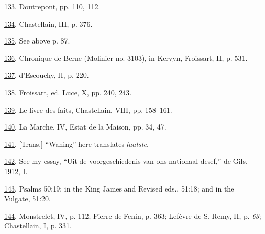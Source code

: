 \protect\hypertarget{23_NOTES.xhtmlux5cux23id_1670}{\protect\hyperlink{10_Chapter_Three__THE_HEROIC_DREAM.xhtmlux5cux23id_1669}{133}}.
Doutrepont, pp. 110, 112.

\protect\hypertarget{23_NOTES.xhtmlux5cux23id_1668}{\protect\hyperlink{10_Chapter_Three__THE_HEROIC_DREAM.xhtmlux5cux23id_1667}{134}}.
Chastellain, III, p. 376.

\protect\hypertarget{23_NOTES.xhtmlux5cux23id_1666}{\protect\hyperlink{10_Chapter_Three__THE_HEROIC_DREAM.xhtmlux5cux23id_1665}{135}}.
See above p. 87.

\protect\hypertarget{23_NOTES.xhtmlux5cux23id_1664}{\protect\hyperlink{10_Chapter_Three__THE_HEROIC_DREAM.xhtmlux5cux23id_1663}{136}}.
Chronique de Berne (Molinier no. 3103), in Kervyn, Froissart, II, p.
531.

\protect\hypertarget{23_NOTES.xhtmlux5cux23id_1662}{\protect\hyperlink{10_Chapter_Three__THE_HEROIC_DREAM.xhtmlux5cux23id_1661}{137}}.
d'Escouchy, II, p. 220.

\protect\hypertarget{23_NOTES.xhtmlux5cux23id_1660}{\protect\hyperlink{10_Chapter_Three__THE_HEROIC_DREAM.xhtmlux5cux23id_1659}{138}}.
Froissart, ed. Luce, X, pp. 240, 243.

\protect\hypertarget{23_NOTES.xhtmlux5cux23id_1658}{\protect\hyperlink{10_Chapter_Three__THE_HEROIC_DREAM.xhtmlux5cux23id_1657}{139}}.
Le livre des faits, Chastellain, VIII, pp. 158--161.

\protect\hypertarget{23_NOTES.xhtmlux5cux23id_1656}{\protect\hyperlink{10_Chapter_Three__THE_HEROIC_DREAM.xhtmlux5cux23id_1655}{140}}.
La Marche, IV, Estat de la Maison, pp. 34, 47.

\protect\hypertarget{23_NOTES.xhtmlux5cux23id_1654}{\protect\hyperlink{10_Chapter_Three__THE_HEROIC_DREAM.xhtmlux5cux23id_1653}{141}}.
{[}Trans.{]} ``Waning'' here translates \emph{laatste}.

\protect\hypertarget{23_NOTES.xhtmlux5cux23id_1652}{\protect\hyperlink{10_Chapter_Three__THE_HEROIC_DREAM.xhtmlux5cux23id_1651}{142}}.
See my essay, ``Uit de voorgeschiedenis van ons nationaal desef,'' de
Gils, 1912, I.

\protect\hypertarget{23_NOTES.xhtmlux5cux23id_1650}{\protect\hyperlink{10_Chapter_Three__THE_HEROIC_DREAM.xhtmlux5cux23id_1649}{143}}.
Psalms 50:19; in the King James and Revised eds., 51:18; and in the
Vulgate, 51:20.

\protect\hypertarget{23_NOTES.xhtmlux5cux23id_1648}{\protect\hyperlink{10_Chapter_Three__THE_HEROIC_DREAM.xhtmlux5cux23id_1647}{144}}.
Monstrelet, IV, p. 112; Pierre de Fenin, p. 363; Lefèvre de S. Remy, II,
p. \emph{63}; Chastellain, I, p. 331.

